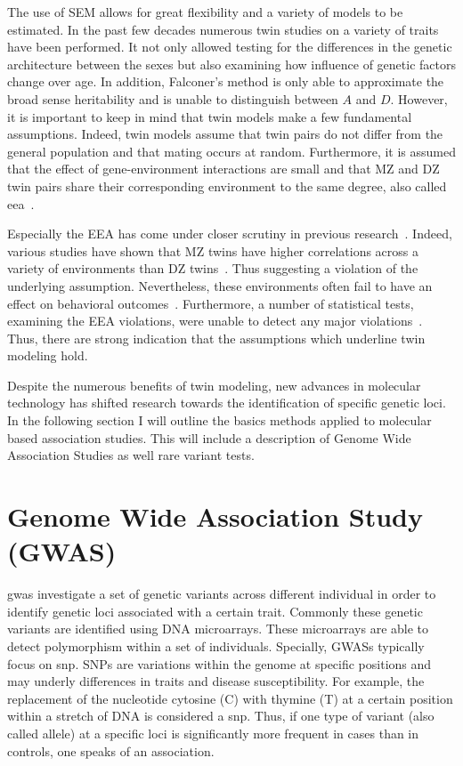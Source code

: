 The use of SEM allows for great flexibility and a variety of models to be estimated.
In the past few decades numerous twin studies on a variety of traits have been performed.
It not only allowed testing for the differences in the genetic architecture between the sexes but also examining how influence of genetic factors change over age.
In addition, Falconer's method is only able to approximate the broad sense heritability and is unable to distinguish between $A$ and $D$.
However, it is important to keep in mind that twin models make a few fundamental assumptions.
Indeed, twin models assume that twin pairs do not differ from the general population and that mating occurs at random.
Furthermore, it is assumed that the effect of gene-environment interactions are small and that MZ and DZ twin pairs share their corresponding environment to the same degree, also called \acrfull{eea}~\cite{Rijsdijk2002}.

Especially the EEA has come under closer scrutiny in previous research~\cite{Martin1997}. 
Indeed, various studies have shown that MZ twins have higher correlations across a variety of environments than DZ twins~\cite{Loehlin1976}.
Thus suggesting a violation of the underlying assumption.
Nevertheless, these environments often fail to have an effect on behavioral outcomes~\cite{Lytton1977}.
Furthermore, a number of statistical tests, examining the EEA violations, were unable to detect any major violations~\cite{Rijsdijk2002,Tuvblad2011a,Freitag2010,Derks2006}.
Thus, there are strong indication that the assumptions which underline twin modeling hold.

Despite the numerous benefits of twin modeling, new advances in molecular technology has shifted research towards the identification of specific genetic loci.
In the following section I will outline the basics methods applied to molecular based association studies.
This will include a description of Genome Wide Association Studies as well rare variant tests.

\section{Genome Wide Association Study (GWAS)}
\label{sec:gwas}

\acrfull{gwas} investigate a set of genetic variants across different individual in order to identify genetic loci associated with a certain trait.
Commonly these genetic variants are identified using DNA microarrays.
These microarrays are able to detect polymorphism within a set of individuals.
Specially, GWASs typically focus on \acrfull{snp}.
SNPs are variations within the genome at specific positions and may underly differences in traits and disease susceptibility. 
For example, the replacement of the nucleotide cytosine (C) with thymine (T) at a certain position within a stretch of DNA is considered a \acrfull{snp}.
Thus, if one type of variant (also called allele) at a specific loci is significantly more frequent in cases than in controls, one speaks of an association.  


